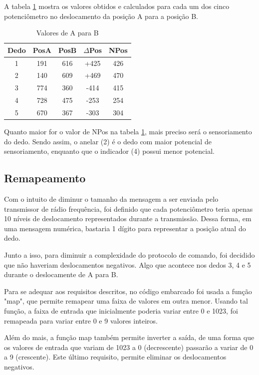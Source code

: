 \documentclass[
	12pt,				%
	openright,			%
	oneside,			%
	a4paper,			%
	english,			%
	brazil				%
	]{abntex2}
\begin{document}
		A tabela \ref{Tab:deltapos} mostra os valores obtidos e calculados para cada um dos cinco potenciômetro no deslocamento da posição A para a posição B.


	\begin{table}[H]
  	\centering
		\caption{Valores de A para B}
    \begin{tabular}{c|cccc}
      \midrule
			Dedo	& PosA	& PosB	& $\Delta$Pos	& NPos	\\
      \midrule
			1 		& 191 	& 616 	& 		+425 		&	426		\\
			2 		& 140 	& 609 	& 		+469 		&	470		\\
			3 		& 774 	& 360 	& 		-414 		&	415		\\
			4 		& 728 	& 475 	& 		-253 		&	254		\\
			5 		& 670 	& 367 	& 		-303 		&	304		\\      
      \midrule
    \end{tabular}
    \label{Tab:deltapos}
	\end{table}
		
		Quanto maior for o valor de NPos na tabela \ref{Tab:deltapos}, mais preciso será o sensoriamento do dedo. Sendo assim, o anelar (2) é o dedo com maior potencial de sensoriamento, enquanto que o indicador (4) possui menor potencial.

	\subsection{Remapeamento}

	 Com o intuito de diminur o tamanho da mensagem a ser enviada pelo transmissor de rádio frequência, foi definido que cada potenciômetro teria apenas 10 níveis de deslocamento representados durante a transmissão. Dessa forma, em uma mensagem numérica, bastaria 1 dígito para representar a posição atual do dedo.

	 Junto a isso, para diminuir a complexidade do protocolo de comando, foi decidido que não haveriam deslocamentos negativos. Algo que acontece nos dedos 3, 4 e 5 durante o deslocamente de A para B.

	 Para se adequar aos requisitos descritos, no código embarcado foi usada a função "map", que permite remapear uma faixa de valores em outra menor. Usando tal função, a faixa de entrada que inicialmente poderia variar entre 0 e 1023, foi remapeada para variar entre 0 e 9 valores inteiros. 
	 
	 Além do mais, a função map também permite inverter a saída, de uma forma que os valores de entrada que variam de 1023 a 0 (decrescente) passarão a variar de 0 a 9 (crescente). Este último requisito, permite eliminar os deslocamentos negativos.
\end{document}

